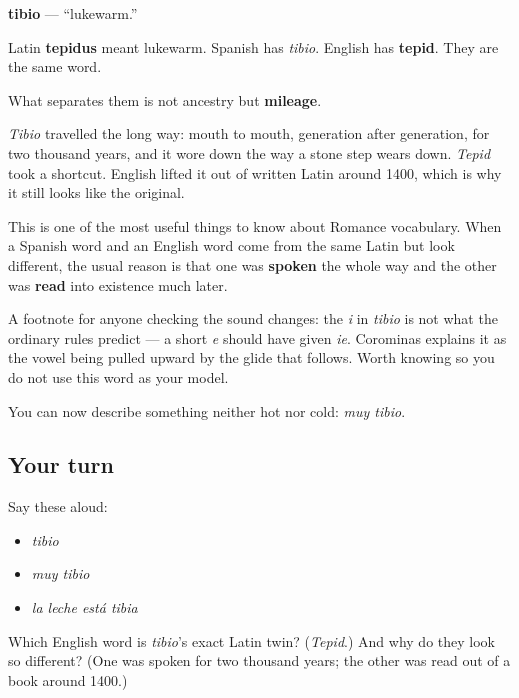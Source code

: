 \begin{cousinweb}
\textbf{tibio} — \textquotedblleft{}lukewarm.\textquotedblright{}

Latin \textbf{tepidus} meant lukewarm. Spanish has \emph{tibio}. English has \textbf{tepid}. They are the same word.

What separates them is not ancestry but \textbf{mileage}.

\emph{Tibio} travelled the long way: mouth to mouth, generation after generation, for two thousand years, and it wore down the way a stone step wears down. \emph{Tepid} took a shortcut. English lifted it out of written Latin around 1400, which is why it still looks like the original.

This is one of the most useful things to know about Romance vocabulary. When a Spanish word and an English word come from the same Latin but look different, the usual reason is that one was \textbf{spoken} the whole way and the other was \textbf{read} into existence much later.

A footnote for anyone checking the sound changes: the \emph{i} in \emph{tibio} is not what the ordinary rules predict — a short \emph{e} should have given \emph{ie}. Corominas explains it as the vowel being pulled upward by the glide that follows. Worth knowing so you do not use this word as your model.
\end{cousinweb}

\begin{grammarlens}[title={What you've built}]
You can now describe something neither hot nor cold: \emph{muy tibio}.
\end{grammarlens}

\subsection*{Your turn}
Say these aloud:

\begin{itemize}
\raggedright
  \item \emph{tibio}
  \item \emph{muy tibio}
  \item \emph{la leche está tibia}
\end{itemize}

\begin{tcolorbox}[breakable,colback=teal!4,colframe=teal!35!black,title={Before you move on}]
Which English word is \emph{tibio}'s exact Latin twin? (\emph{Tepid}.) And why do they look so different? (One was spoken for two thousand years; the other was read out of a book around 1400.)
\end{tcolorbox}
